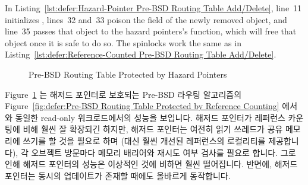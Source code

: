 In
Listing~\ref{lst:defer:Hazard-Pointer Pre-BSD Routing Table Add/Delete},
line~11 initializes ,
lines~32 and~33 poison the  field of the newly removed
object, and
line~35 passes that object to the hazard pointers's
 function, which will free that object once it
is safe to do so.
The spinlocks work the same as in
Listing~\ref{lst:defer:Reference-Counted Pre-BSD Routing Table Add/Delete}.
\fi

\begin{figure}[tb]
\centering
{}
\caption{Pre-BSD Routing Table Protected by Hazard Pointers}
\label{fig:defer:Pre-BSD Routing Table Protected by Hazard Pointers}
\end{figure}

Figure~\ref{fig:defer:Pre-BSD Routing Table Protected by Hazard Pointers} 는
해저드 포인터로 보호되는 Pre-BSD 라우팅 알고리즘의
Figure~\ref{fig:defer:Pre-BSD Routing Table Protected by Reference Counting}
에서와 동일한 read-only 워크로드에서의 성능을 보입니다.
해저드 포인터가 레퍼런스 카운팅에 비해 훨씬 잘 확장되긴 하지만, 해저드 포인터는
여전히 읽기 쓰레드가 공유 메모리에 쓰기를 할 것을 필요로 하며 (대신 훨씬 개선된
레퍼런스의 로컬리티를 제공합니다), 각 오브젝트 방문마다 메모리 배리어와 재시도
여부 검사를 필요로 합니다.
그로 인해 해저드 포인터의 성능은 이상적인 것에 비하면 훨씬 떨어집니다.
반면에, 해저드 포인터는 동시의 업데이트가 존재할 때에도 올바르게 동작합니다.
\iffalse

